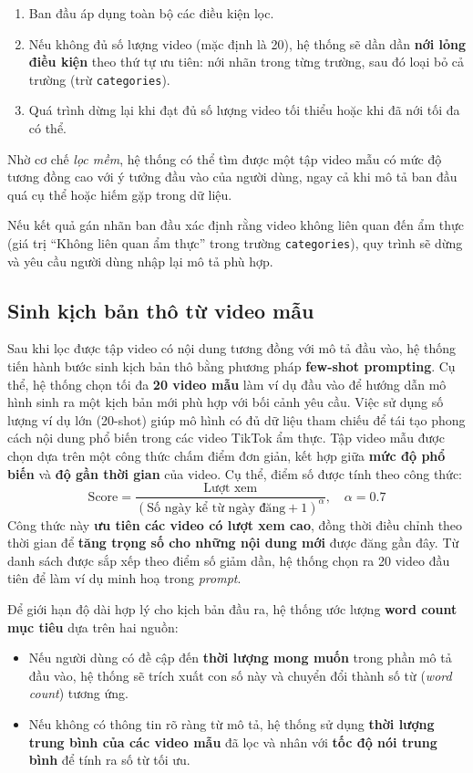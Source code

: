 \begin{enumerate}
    \item Ban đầu áp dụng toàn bộ các điều kiện lọc.
    \item Nếu không đủ số lượng video (mặc định là 20), hệ thống sẽ dần dần \textbf{nới lỏng điều kiện} theo thứ tự ưu tiên: nới nhãn trong từng trường, sau đó loại bỏ cả trường (trừ \texttt{categories}).
    \item Quá trình dừng lại khi đạt đủ số lượng video tối thiểu hoặc khi đã nới tối đa có thể.
\end{enumerate}

\noindent Nhờ cơ chế \textit{lọc mềm}, hệ thống có thể tìm được một tập video mẫu có mức độ tương đồng cao với ý tưởng đầu vào của người dùng, ngay cả khi mô tả ban đầu quá cụ thể hoặc hiếm gặp trong dữ liệu.

Nếu kết quả gán nhãn ban đầu xác định rằng video không liên quan đến ẩm thực (giá trị ``Không liên quan ẩm thực'' trong trường \texttt{categories}), quy trình sẽ dừng và yêu cầu người dùng nhập lại mô tả phù hợp.

\subsection{Sinh kịch bản thô từ video mẫu}

Sau khi lọc được tập video có nội dung tương đồng với mô tả đầu vào, hệ thống tiến hành bước sinh kịch bản thô bằng phương pháp \textbf{few-shot prompting}. Cụ thể, hệ thống chọn tối đa \textbf{20 video mẫu} làm ví dụ đầu vào để hướng dẫn mô hình sinh ra một kịch bản mới phù hợp với bối cảnh yêu cầu. Việc sử dụng số lượng ví dụ lớn (20-shot) giúp mô hình có đủ dữ liệu tham chiếu để tái tạo phong cách nội dung phổ biến trong các video TikTok ẩm thực.
Tập video mẫu được chọn dựa trên một công thức chấm điểm đơn giản, kết hợp giữa \textbf{mức độ phổ biến} và \textbf{độ gần thời gian} của video. Cụ thể, điểm số được tính theo công thức:
\[
\text{Score} = \frac{\text{Lượt xem}}{(\text{Số ngày kể từ ngày đăng} + 1)^{\alpha}}, \quad \alpha = 0.7
\]
Công thức này \textbf{ưu tiên các video có lượt xem cao}, đồng thời điều chỉnh theo thời gian để \textbf{tăng trọng số cho những nội dung mới} được đăng gần đây. Từ danh sách được sắp xếp theo điểm số giảm dần, hệ thống chọn ra 20 video đầu tiên để làm ví dụ minh hoạ trong \textit{prompt}.

Để giới hạn độ dài hợp lý cho kịch bản đầu ra, hệ thống ước lượng \textbf{word count mục tiêu} dựa trên hai nguồn:
\begin{itemize}
    \item Nếu người dùng có đề cập đến \textbf{thời lượng mong muốn} trong phần mô tả đầu vào, hệ thống sẽ trích xuất con số này và chuyển đổi thành số từ (\textit{word count}) tương ứng.
    \item Nếu không có thông tin rõ ràng từ mô tả, hệ thống sử dụng \textbf{thời lượng trung bình của các video mẫu} đã lọc và nhân với \textbf{tốc độ nói trung bình} để tính ra số từ tối ưu.
\end{itemize}

